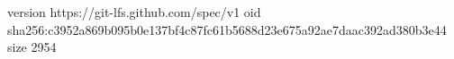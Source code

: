 version https://git-lfs.github.com/spec/v1
oid sha256:c3952a869b095b0e137bf4c87fc61b5688d23e675a92ae7daac392ad380b3e44
size 2954
